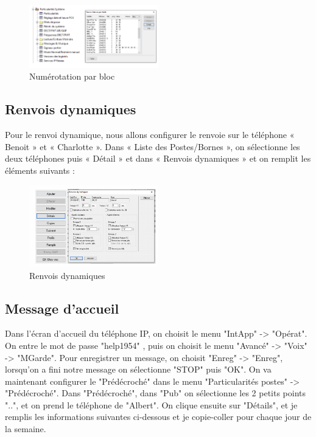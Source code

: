 \documentclass[12pt, a4paper]{article}
\begin{document}
	\begin{figure}[H]
		\centering
		\includegraphics[width=0.5\textwidth]{img/bloc.png}
		\caption{Numérotation par bloc}
		\label{fig:bloc}
	\end{figure}

	\subsection{Renvois dynamiques}

	Pour le renvoi dynamique, nous allons configurer le renvoie sur le téléphone
	« Benoit » et « Charlotte ». Dans « Liste des Postes/Bornes », on sélectionne
	les deux téléphones puis « Détail » et dans « Renvois dynamiques » et on remplit
	les éléments suivants :

	\begin{figure}[H]
		\centering
		\includegraphics[width=0.5\textwidth]{img/nbloc.png}
		\caption{Renvois dynamiques}
		\label{fig:nbloc}
	\end{figure}

	\subsection{Message d'accueil}

	Dans l’écran d’accueil du téléphone IP, on choisit le menu "IntApp" -> "Opérat".
	On entre le mot de passe "help1954" , puis on choisit le menu "Avancé" -> "Voix" ->
	"MGarde". Pour enregistrer un message, on choisit "Enreg" -> "Enreg", lorsqu’on a
	fini notre message on sélectionne "STOP" puis "OK". On va maintenant configurer le
	"Prédécroché" dans le menu "Particularités postes" -> "Prédécroché". Dans
	"Prédécroché", dans "Pub" on sélectionne les 2 petits points "..", et on prend le
	téléphone de "Albert". On clique ensuite sur "Détails", et je remplis les informations
	suivantes ci-dessous et je copie-coller pour chaque jour de la semaine.
\end{document}
